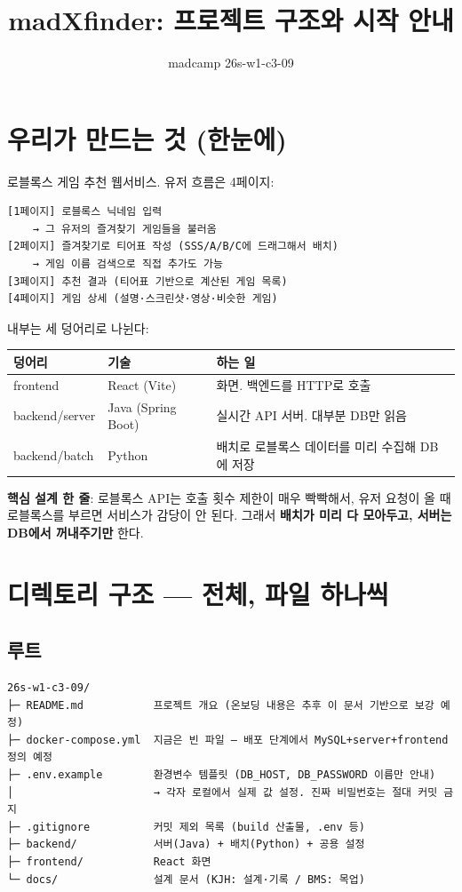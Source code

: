 \documentclass[11pt]{article}
\title{madXfinder: 프로젝트 구조와 시작 안내}
\author{madcamp 26s-w1-c3-09}
\date{}
\begin{document}
\maketitle

\section{우리가 만드는 것 (한눈에)}

로블록스 게임 추천 웹서비스. 유저 흐름은 4페이지:

\begin{Verbatim}[frame=single]
[1페이지] 로블록스 닉네임 입력
    → 그 유저의 즐겨찾기 게임들을 불러옴
[2페이지] 즐겨찾기로 티어표 작성 (SSS/A/B/C에 드래그해서 배치)
    → 게임 이름 검색으로 직접 추가도 가능
[3페이지] 추천 결과 (티어표 기반으로 계산된 게임 목록)
[4페이지] 게임 상세 (설명·스크린샷·영상·비슷한 게임)
\end{Verbatim}

내부는 세 덩어리로 나뉜다:

\begin{center}
\begin{tabular}{lll}
\toprule
덩어리 & 기술 & 하는 일 \\
\midrule
frontend & React (Vite) & 화면. 백엔드를 HTTP로 호출 \\
backend/server & Java (Spring Boot) & 실시간 API 서버. 대부분 DB만 읽음 \\
backend/batch & Python & 배치로 로블록스 데이터를 미리 수집해 DB에 저장 \\
\bottomrule
\end{tabular}
\end{center}

\textbf{핵심 설계 한 줄}: 로블록스 API는 호출 횟수 제한이 매우 빡빡해서,
유저 요청이 올 때 로블록스를 부르면 서비스가 감당이 안 된다.
그래서 \textbf{배치가 미리 다 모아두고, 서버는 DB에서 꺼내주기만} 한다.

\section{디렉토리 구조 --- 전체, 파일 하나씩}

\subsection{루트}
\begin{Verbatim}[frame=single, fontsize=\small]
26s-w1-c3-09/
├─ README.md           프로젝트 개요 (온보딩 내용은 추후 이 문서 기반으로 보강 예정)
├─ docker-compose.yml  지금은 빈 파일 — 배포 단계에서 MySQL+server+frontend 정의 예정
├─ .env.example        환경변수 템플릿 (DB_HOST, DB_PASSWORD 이름만 안내)
│                      → 각자 로컬에서 실제 값 설정. 진짜 비밀번호는 절대 커밋 금지
├─ .gitignore          커밋 제외 목록 (build 산출물, .env 등)
├─ backend/            서버(Java) + 배치(Python) + 공용 설정
├─ frontend/           React 화면
└─ docs/               설계 문서 (KJH: 설계·기록 / BMS: 목업)
\end{Verbatim}
\end{document}
